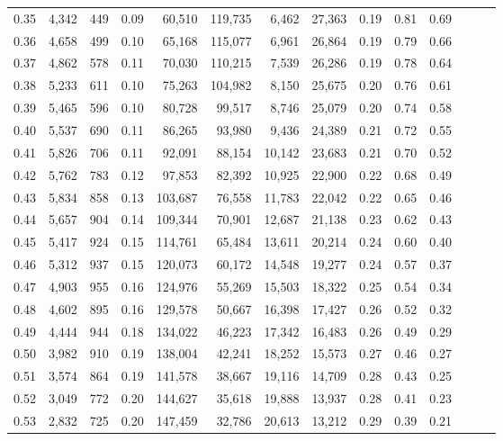 \begin{tabular}{rrrrrrrrrrrrrr}
0.35 &  4,342 &  449 &  0.09 &   60,510 &  119,735 &   6,462 &  27,363 &  0.19 &  0.81 &      0.69 \\
0.36 &  4,658 &  499 &  0.10 &   65,168 &  115,077 &   6,961 &  26,864 &  0.19 &  0.79 &      0.66 \\
0.37 &  4,862 &  578 &  0.11 &   70,030 &  110,215 &   7,539 &  26,286 &  0.19 &  0.78 &      0.64 \\
0.38 &  5,233 &  611 &  0.10 &   75,263 &  104,982 &   8,150 &  25,675 &  0.20 &  0.76 &      0.61 \\
0.39 &  5,465 &  596 &  0.10 &   80,728 &   99,517 &   8,746 &  25,079 &  0.20 &  0.74 &      0.58 \\
0.40 &  5,537 &  690 &  0.11 &   86,265 &   93,980 &   9,436 &  24,389 &  0.21 &  0.72 &      0.55 \\
0.41 &  5,826 &  706 &  0.11 &   92,091 &   88,154 &  10,142 &  23,683 &  0.21 &  0.70 &      0.52 \\
0.42 &  5,762 &  783 &  0.12 &   97,853 &   82,392 &  10,925 &  22,900 &  0.22 &  0.68 &      0.49 \\
0.43 &  5,834 &  858 &  0.13 &  103,687 &   76,558 &  11,783 &  22,042 &  0.22 &  0.65 &      0.46 \\
0.44 &  5,657 &  904 &  0.14 &  109,344 &   70,901 &  12,687 &  21,138 &  0.23 &  0.62 &      0.43 \\
0.45 &  5,417 &  924 &  0.15 &  114,761 &   65,484 &  13,611 &  20,214 &  0.24 &  0.60 &      0.40 \\
0.46 &  5,312 &  937 &  0.15 &  120,073 &   60,172 &  14,548 &  19,277 &  0.24 &  0.57 &      0.37 \\
0.47 &  4,903 &  955 &  0.16 &  124,976 &   55,269 &  15,503 &  18,322 &  0.25 &  0.54 &      0.34 \\
0.48 &  4,602 &  895 &  0.16 &  129,578 &   50,667 &  16,398 &  17,427 &  0.26 &  0.52 &      0.32 \\
0.49 &  4,444 &  944 &  0.18 &  134,022 &   46,223 &  17,342 &  16,483 &  0.26 &  0.49 &      0.29 \\
0.50 &  3,982 &  910 &  0.19 &  138,004 &   42,241 &  18,252 &  15,573 &  0.27 &  0.46 &      0.27 \\
0.51 &  3,574 &  864 &  0.19 &  141,578 &   38,667 &  19,116 &  14,709 &  0.28 &  0.43 &      0.25 \\
0.52 &  3,049 &  772 &  0.20 &  144,627 &   35,618 &  19,888 &  13,937 &  0.28 &  0.41 &      0.23 \\
0.53 &  2,832 &  725 &  0.20 &  147,459 &   32,786 &  20,613 &  13,212 &  0.29 &  0.39 &      0.21 \\

\end{tabular}
